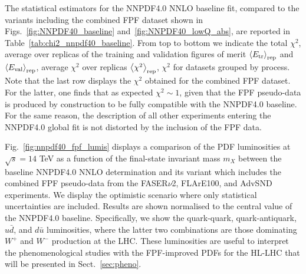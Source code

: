 The statistical estimators for the NNPDF4.0 NNLO
baseline fit, compared to the variants including
the combined FPF dataset shown in Figs.~\ref{fig:NNPDF40_baseline}
and~\ref{fig:NNPDF40_lowQ_abs}, are reported in Table~\ref{tab:chi2_nnpdf40_baseline}.
%
From top to bottom we indicate the total $\chi^2$, average
over replicas of the training and validation figures of merit
$\left\langle E_{\rm tr}\right\rangle_{\rm rep}$ and $\left\langle E_{\rm val}\right\rangle_{\rm rep}$,
average $\chi^2$ over replicas $\left\langle \chi^2\right\rangle_{\rm rep}$,
$\chi^2$ for datasets grouped by process.
%
Note that the last row displays the $\chi^2$ obtained for the combined FPF dataset.
%
For the latter, one finds that as expected $\chi^2 \sim 1$, given that the FPF pseudo-data
is produced by construction to be fully compatible with the NNPDF4.0 baseline.
%
For the same reason, the description of all other experiments entering
the NNPDF4.0 global fit is not distorted by the inclusion of the FPF data.

Fig.~\ref{fig:nnpdf40_fpf_lumis} displays a comparison of the PDF luminosities at $\sqrt{s}=14$ TeV
as a function of the final-state invariant mass $m_X$ between
the baseline NNPDF4.0 NNLO determination and its variant which includes
the combined FPF pseudo-data from the FASER$\nu$2, FLArE100, and AdvSND experiments.
%
We display the optimistic scenario where only statistical uncertainties
  are included. 
%
  Results are shown normalised to the central value of the NNPDF4.0 baseline.
  Specifically, we show the quark-quark, quark-antiquark, $u\bar{d}$, and $d\bar{u}$
  luminosities, where the latter two combinations are those dominating $W^+$ and $W^-$ production
  at the LHC.
These luminosities are useful to interpret the phenomenological studies with the FPF-improved
PDFs for the HL-LHC that will be presented in Sect.~\ref{sec:pheno}.

